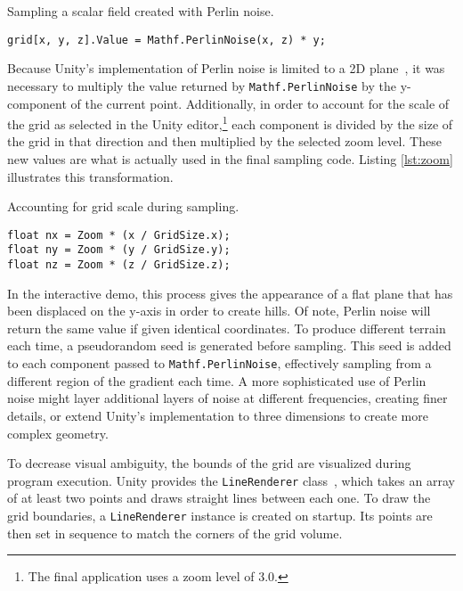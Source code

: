 \documentclass[pageno]{jpaper}
\begin{document}
\begin{listing}[H]
\linespread{1.0}
\caption{Sampling a scalar field created with Perlin noise.}
\begin{verbatim}
grid[x, y, z].Value = Mathf.PerlinNoise(x, z) * y;
\end{verbatim}
\label{lst:perlin}
\end{listing}

Because Unity's implementation of Perlin noise is limited to a 2D plane~\cite{unityperlin}, it was necessary to multiply the value returned by \texttt{Mathf.PerlinNoise} by the y-component of the current point. Additionally, in order to account for the scale of the grid as selected in the Unity editor,\footnote{The final application uses a zoom level of 3.0.} each component is divided by the size of the grid in that direction and then multiplied by the selected zoom level. These new values are what is actually used in the final sampling code. Listing \ref{lst:zoom} illustrates this transformation.

\begin{listing}[H]
\linespread{1.0}
\caption{Accounting for grid scale during sampling.}
\begin{verbatim}
float nx = Zoom * (x / GridSize.x);
float ny = Zoom * (y / GridSize.y);
float nz = Zoom * (z / GridSize.z);
\end{verbatim}
\label{lst:zoom}
\end{listing}

In the interactive demo, this process gives the appearance of a flat plane that has been displaced on the y-axis in order to create hills. Of note, Perlin noise will return the same value if given identical coordinates. To produce different terrain each time, a pseudorandom seed is generated before sampling. This seed is added to each component passed to \texttt{Mathf.PerlinNoise}, effectively sampling from a different region of the gradient each time. A more sophisticated use of Perlin noise might layer additional layers of noise at different frequencies, creating finer details, or extend Unity's implementation to three dimensions to create more complex geometry.

To decrease visual ambiguity, the bounds of the grid are visualized during program execution. Unity provides the \texttt{LineRenderer} class~\cite{unityline}, which takes an array of at least two points and draws straight lines between each one. To draw the grid boundaries, a \texttt{LineRenderer} instance is created on startup. Its points are then set in sequence to match the corners of the grid volume.
\end{document}
